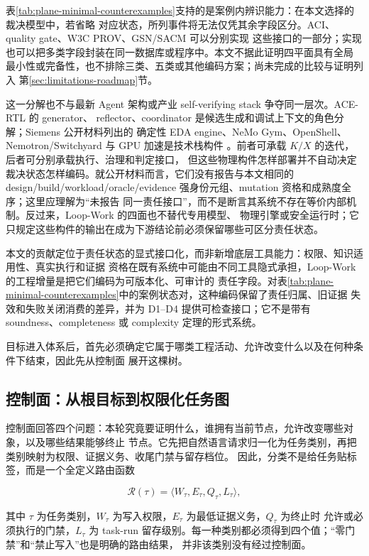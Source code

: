\documentclass[UTF8,a4paper,zihao=-4,oneside]{ctexart}
\begin{document}
表\ref{tab:plane-minimal-counterexamples}支持的是案例内辨识能力：在本文选择的裁决模型中，若省略
对应状态，所列事件将无法仅凭其余字段区分。ACI、quality gate、W3C PROV、GSN/SACM 可以分别实现
这些接口的一部分；实现也可以把多类字段封装在同一数据库或程序中。本文不据此证明四平面具有全局
最小性或完备性，也不排除三类、五类或其他编码方案；尚未完成的比较与证明列入
第\ref{sec:limitations-roadmap}节。

这一分解也不与最新 Agent 架构或产业 self-verifying stack 争夺同一层次。ACE-RTL 的 generator、
reflector、coordinator 是候选生成和调试上下文的角色分解\cite{deng2026acertl}；Siemens 公开材料列出的
确定性 EDA engine、NeMo Gym、OpenShell、Nemotron/Switchyard 与 GPU 加速是技术栈构件
\cite{siemens2026selfverifying}。前者可承载 $K/X$ 的迭代，后者可分别承载执行、治理和判定接口，
但这些物理构件怎样部署并不自动决定裁决状态怎样编码。就公开材料而言，它们没有报告与本文相同的
design/build/workload/oracle/evidence 强身份元组、mutation 资格和成熟度全序；这里应理解为“未报告
同一责任接口”，而不是断言其系统不存在等价内部机制。反过来，Loop-Work 的四面也不替代专用模型、
物理引擎或安全运行时；它只规定这些构件的输出在成为下游结论前必须保留哪些可区分责任状态。

本文的贡献定位于责任状态的显式接口化，而非新增底层工具能力：权限、知识适用性、真实执行和证据
资格在既有系统中可能由不同工具隐式承担，Loop-Work 的工程增量是把它们编码为可版本化、可审计的
责任字段。对表\ref{tab:plane-minimal-counterexamples}中的案例状态对，这种编码保留了责任归属、旧证据
失效和失败关闭消费的差异，并为 D1--D4 提供可检查接口；它不是带有 soundness、completeness 或
complexity 定理的形式系统。

目标进入体系后，首先必须确定它属于哪类工程活动、允许改变什么以及在何种条件下结束，因此先从控制面
展开这棵树。

\subsection{控制面：从根目标到权限化任务图}

控制面回答四个问题：本轮究竟要证明什么，谁拥有当前节点，允许改变哪些对象，以及哪些结果能够终止
节点。它先把自然语言请求归一化为任务类别，再把类别映射为权限、证据义务、收尾门禁与留存档位。
因此，分类不是给任务贴标签，而是一个全定义路由函数

\[
\mathcal{R}(\tau)=\langle W_{\tau},E_{\tau},Q_{\tau},L_{\tau}\rangle,
\]

其中 $\tau$ 为任务类别，$W_{\tau}$ 为写入权限，$E_{\tau}$ 为最低证据义务，$Q_{\tau}$ 为终止时
允许或必须执行的门禁，$L_{\tau}$ 为
task-run 留存级别。每一种类别都必须得到四个值；“零门禁”和“禁止写入”也是明确的路由结果，
并非该类别没有经过控制面。
\end{document}

